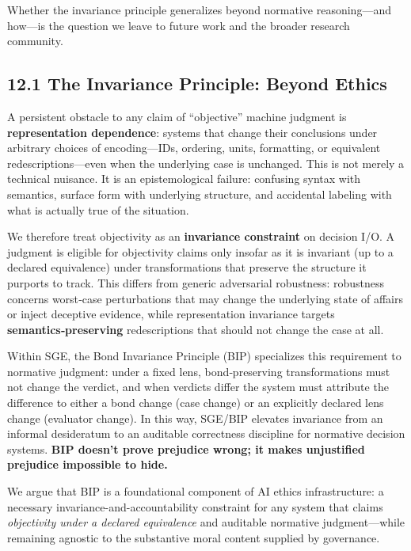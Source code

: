 \documentclass[12pt]{article}
\theoremstyle{plain}
\theoremstyle{definition}
\theoremstyle{remark}
\begin{document}
Whether the invariance principle generalizes beyond normative
reasoning---and how---is the question we leave to future work and the
broader research community.

\subsection{12.1 The Invariance Principle: Beyond
Ethics}\label{the-invariance-principle-beyond-ethics}

A persistent obstacle to any claim of ``objective'' machine judgment is
\textbf{representation dependence}: systems that change their
conclusions under arbitrary choices of encoding---IDs, ordering, units,
formatting, or equivalent redescriptions---even when the underlying case
is unchanged. This is not merely a technical nuisance. It is an
epistemological failure: confusing syntax with semantics, surface form
with underlying structure, and accidental labeling with what is actually
true of the situation.

We therefore treat objectivity as an \textbf{invariance constraint} on
decision I/O. A judgment is eligible for objectivity claims only insofar
as it is invariant (up to a declared equivalence) under transformations
that preserve the structure it purports to track. This differs from
generic adversarial robustness: robustness concerns worst‑case
perturbations that may change the underlying state of affairs or inject
deceptive evidence, while representation invariance targets
\textbf{semantics‑preserving} redescriptions that should not change the
case at all.

Within SGE, the Bond Invariance Principle (BIP) specializes this
requirement to normative judgment: under a fixed lens, bond‑preserving
transformations must not change the verdict, and when verdicts differ
the system must attribute the difference to either a bond change (case
change) or an explicitly declared lens change (evaluator change). In
this way, SGE/BIP elevates invariance from an informal desideratum to an
auditable correctness discipline for normative decision systems.
\textbf{BIP doesn't prove prejudice wrong; it makes unjustified
prejudice impossible to hide.}

We argue that BIP is a foundational component of AI ethics
infrastructure: a necessary invariance-and-accountability constraint for
any system that claims \emph{objectivity under a declared equivalence}
and auditable normative judgment---while remaining agnostic to the
substantive moral content supplied by governance.
\end{document}
